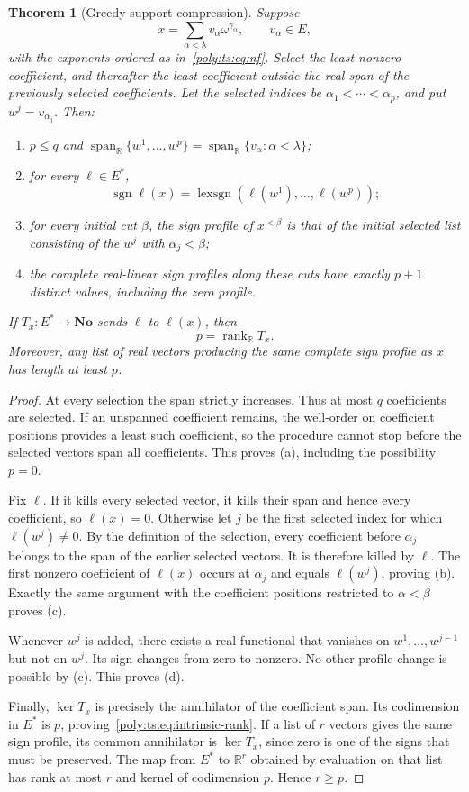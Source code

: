 \documentclass[11pt,a4paper]{article}
\numberwithin{equation}{section}
\newtheorem{theorem}{Theorem}[section]
\theoremstyle{plain}
\newcommand{\No}{\mathbf{No}}
\newcommand{\R}{\mathbb R}
\newcommand{\sgn}{\operatorname{sgn}}
\newcommand{\rank}{\operatorname{rank}}
\newcommand{\spanR}{\operatorname{span}_{\R}}
\newcommand{\lexsgn}{\operatorname{lexsgn}}
\begin{document}
\begin{theorem}[Greedy support compression]\label{poly:ts:thm:compression}
Suppose
\[
 x=\sum_{\alpha<\lambda}v_\alpha\omega^{\gamma_\alpha},\qquad v_\alpha\in E,
\]
with the exponents ordered as in~\eqref{poly:ts:eq:nf}. Select the least nonzero
coefficient, and thereafter the least coefficient outside the real span of
the previously selected coefficients. Let the selected indices be
$\alpha_1<\cdots<\alpha_p$, and put $w^j=v_{\alpha_j}$. Then:
\begin{enumerate}[label=(\alph*)]
\item $p\le q$ and $\spanR\{w^1,\ldots,w^p\}=
\spanR\{v_\alpha:\alpha<\lambda\}$;
\item for every $\ell\in E^*$,
\[
 \sgn\ell(x)=\lexsgn(\ell(w^1),\ldots,\ell(w^p));
\]
\item for every initial cut $\beta$, the sign profile of $x^{<\beta}$ is
that of the initial selected list consisting of the $w^j$ with
$\alpha_j<\beta$;
\item the complete real-linear sign profiles along these cuts have exactly
$p+1$ distinct values, including the zero profile.
\end{enumerate}
If $T_x:E^*\to\No$ sends $\ell$ to $\ell(x)$, then
\begin{equation}\label{poly:ts:eq:intrinsic-rank}
 p=\rank_\R T_x.
\end{equation}
Moreover, any list of real vectors producing the same complete sign profile
as $x$ has length at least $p$.
\end{theorem}
\begin{proof}
At every selection the span strictly increases. Thus at most $q$
coefficients are selected. If an unspanned coefficient remains, the
well-order on coefficient positions provides a least such coefficient, so
the procedure cannot stop before the selected vectors span all coefficients.
This proves (a), including the possibility $p=0$.

Fix $\ell$. If it kills every selected vector, it kills their span and hence
every coefficient, so $\ell(x)=0$. Otherwise let $j$ be the first selected
index for which $\ell(w^j)\ne0$. By the definition of the selection, every
coefficient before $\alpha_j$ belongs to the span of the earlier selected
vectors. It is therefore killed by $\ell$. The first nonzero coefficient of
$\ell(x)$ occurs at $\alpha_j$ and equals $\ell(w^j)$, proving (b).
Exactly the same argument with the coefficient positions restricted to
$\alpha<\beta$ proves (c).

Whenever $w^j$ is added, there exists a real functional that vanishes on
$w^1,\ldots,w^{j-1}$ but not on $w^j$. Its sign changes from zero to nonzero.
No other profile change is possible by (c). This proves (d).

Finally, $\ker T_x$ is precisely the annihilator of the coefficient span.
Its codimension in $E^*$ is $p$, proving~\eqref{poly:ts:eq:intrinsic-rank}. If a
list of $r$ vectors gives the same sign profile, its common annihilator is
$\ker T_x$, since zero is one of the signs that must be preserved. The map
from $E^*$ to $\R^r$ obtained by evaluation on that list has rank at most
$r$ and kernel of codimension $p$. Hence $r\ge p$.
\end{proof}
\end{document}

